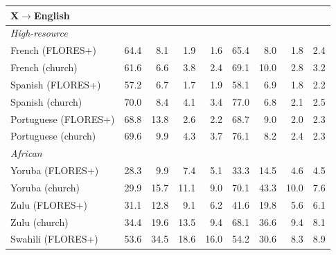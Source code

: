 \begin{table}[htbp]
\begin{tabular}{lrrrrrrrr}
\midrule \multicolumn{9}{l}{\textbf{X$\rightarrow$English}} \\ \midrule
\multicolumn{9}{l}{\textit{High-resource}} \\
French (FLORES+) & 64.4 & \cellcolor{loss!11}8.1 & \cellcolor{loss!3}1.9 & \cellcolor{loss!2}1.6 & 65.4 & \cellcolor{loss!11}8.0 & \cellcolor{loss!3}1.8 & \cellcolor{loss!3}2.4 \\
French (church) & 61.6 & \cellcolor{loss!9}6.6 & \cellcolor{loss!5}3.8 & \cellcolor{loss!3}2.4 & 69.1 & \cellcolor{loss!14}10.0 & \cellcolor{loss!4}2.8 & \cellcolor{loss!4}3.2 \\
Spanish (FLORES+) & 57.2 & \cellcolor{loss!9}6.7 & \cellcolor{loss!2}1.7 & \cellcolor{loss!3}1.9 & 58.1 & \cellcolor{loss!10}6.9 & \cellcolor{loss!3}1.8 & \cellcolor{loss!3}2.2 \\
Spanish (church) & 70.0 & \cellcolor{loss!12}8.4 & \cellcolor{loss!6}4.1 & \cellcolor{loss!5}3.4 & 77.0 & \cellcolor{loss!9}6.8 & \cellcolor{loss!3}2.1 & \cellcolor{loss!3}2.5 \\
Portuguese (FLORES+) & 68.8 & \cellcolor{loss!19}13.8 & \cellcolor{loss!4}2.6 & \cellcolor{loss!3}2.2 & 68.7 & \cellcolor{loss!13}9.0 & \cellcolor{loss!3}2.0 & \cellcolor{loss!3}2.3 \\
Portuguese (church) & 69.6 & \cellcolor{loss!14}9.9 & \cellcolor{loss!6}4.3 & \cellcolor{loss!5}3.7 & 76.1 & \cellcolor{loss!11}8.2 & \cellcolor{loss!3}2.4 & \cellcolor{loss!3}2.3 \\
\midrule \multicolumn{9}{l}{\textit{African}} \\
Yoruba (FLORES+) & 28.3 & \cellcolor{loss!14}9.9 & \cellcolor{loss!10}7.4 & \cellcolor{loss!7}5.1 & 33.3 & \cellcolor{loss!20}14.5 & \cellcolor{loss!6}4.6 & \cellcolor{loss!6}4.5 \\
Yoruba (church) & 29.9 & \cellcolor{loss!22}15.7 & \cellcolor{loss!15}11.1 & \cellcolor{loss!12}9.0 & 70.1 & \cellcolor{loss!60}43.3 & \cellcolor{loss!14}10.0 & \cellcolor{loss!11}7.6 \\
Zulu (FLORES+) & 31.1 & \cellcolor{loss!18}12.8 & \cellcolor{loss!13}9.1 & \cellcolor{loss!9}6.2 & 41.6 & \cellcolor{loss!27}19.8 & \cellcolor{loss!8}5.6 & \cellcolor{loss!8}6.1 \\
Zulu (church) & 34.4 & \cellcolor{loss!27}19.6 & \cellcolor{loss!19}13.5 & \cellcolor{loss!13}9.4 & 68.1 & \cellcolor{loss!51}36.6 & \cellcolor{loss!13}9.4 & \cellcolor{loss!11}8.1 \\
Swahili (FLORES+) & 53.6 & \cellcolor{loss!48}34.5 & \cellcolor{loss!26}18.6 & \cellcolor{loss!22}16.0 & 54.2 & \cellcolor{loss!42}30.6 & \cellcolor{loss!11}8.3 & \cellcolor{loss!12}8.9 \\

\end{tabular}
\end{table}
